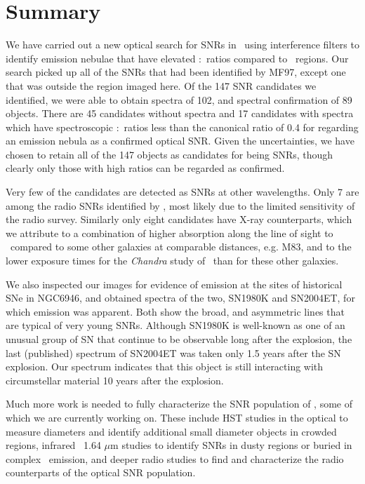 \section{Summary \label{sec:summary}}

We have carried out a new optical search for SNRs in \gal\ using interference filters to identify emission nebulae that have elevated \sii:\ha\ ratios compared to \hii\ regions.  Our search picked up all of the SNRs that had been identified by MF97, except one that was outside the region imaged here. Of the 147 SNR candidates we identified, we were able to obtain spectra of 102, and spectral confirmation of 89 objects.  There are 45 candidates  without spectra and 17 candidates with spectra which have spectroscopic \sii:\ha\ ratios less than the canonical ratio of 0.4 for regarding an emission nebula as a confirmed optical SNR.  Given the uncertainties, we have chosen to retain all of the 147 objects as candidates for being SNRs, though clearly only those with high ratios can be regarded as confirmed.  

Very few of the candidates are detected as SNRs at other wavelengths.  Only 7 are among the radio SNRs identified by \cite{lacey01}, most likely due to the limited sensitivity of the radio survey. Similarly only eight candidates have X-ray counterparts, which we attribute to a combination of higher absorption along the line of sight to \gal\ compared to some other galaxies at comparable distances, e.g. M83, and to the %
lower exposure times for the {\em Chandra} study of \gal\ than for these other galaxies. 


We also inspected our images for evidence of emission at the sites of historical SNe in NGC6946, and obtained spectra of the two, SN1980K and SN2004ET, for which emission was apparent.  Both show the broad, and asymmetric lines that are typical of very young SNRs.  Although SN1980K is well-known as one of an unusual group of SN that continue to be observable long after the explosion, the last (published) spectrum  of SN2004ET was taken only 1.5 years after the SN explosion.  Our spectrum indicates that this object is still interacting with circumstellar material 10 years after the explosion.

Much more work is needed to fully characterize the SNR population of \gal, some of which we are currently working on.  These include HST studies in the optical to measure diameters and identify additional small diameter objects in crowded regions, infrared \feii\ 1.64 $\mu$m studies to identify SNRs in dusty regions or buried in complex \ha\ emission, and deeper radio studies to find and characterize the radio counterparts of the optical SNR population. 

